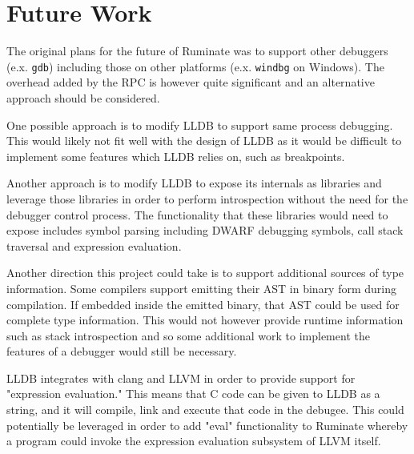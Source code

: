 \documentclass{report}
\begin{document}
\section{Future Work}
\label{sec:future_work}
The original plans for the future of Ruminate was to support other debuggers
(e.x. \lstinline|gdb|) including those on other platforms (e.x.
\lstinline|windbg| on Windows). The overhead added by the RPC is however quite
significant and an alternative approach should be considered.

One possible approach is to modify LLDB to support same process debugging. This
would likely not fit well with the design of LLDB as it would be difficult
to implement some features which LLDB relies on, such as breakpoints.

Another approach is to modify LLDB to expose its internals as libraries and
leverage those libraries in order to perform introspection without the need for
the debugger control process. The functionality that these libraries would need
to expose includes symbol parsing including DWARF debugging symbols, call stack
traversal and expression evaluation.

Another direction this project could take is to support additional sources of
type information. Some compilers support emitting their AST in binary form
during compilation. If embedded inside the emitted binary, that AST could be
used for complete type information. This would not however provide runtime
information such as stack introspection and so some additional work to implement
the features of a debugger would still be necessary.

LLDB integrates with clang and LLVM in order to provide support for "expression
evaluation." This means that C code can be given to LLDB as a string, and it
will compile, link and execute that code in the debugee. This could potentially
be leveraged in order to add "eval" functionality to Ruminate whereby a program
could invoke the expression evaluation subsystem of LLVM itself.

\printbibliography



\end{document}
